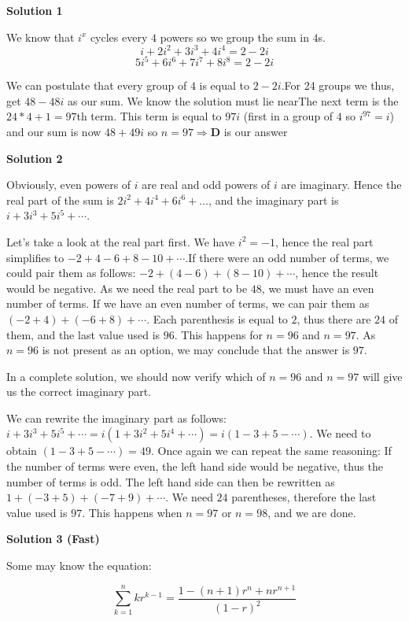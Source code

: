 \begin{enumerate}
\textbf{Solution 1}

We know that $i^x$ cycles every $4$ powers so we group the sum in $4$s. 
 \[i+2i^2+3i^3+4i^4=2-2i\]
 \[5i^5+6i^6+7i^7+8i^8=2-2i\]

 We can postulate that every group of $4$ is equal to $2-2i$.For 24 groups we thus, get $48-48i$ as our sum. We know the solution must lie nearThe next term is the $24*4+1=97$th term. This term is equal to $97i$ (first in a group of $4$ so $i^{97}=i$) and our sum is now $48+49i$ so $n=97\Rightarrow\boxed{\mathbf{D}}$ is our answer

 



\textbf{Solution 2}

Obviously, even powers of $i$ are real and odd powers of $i$ are imaginary. Hence the real part of the sum is $2i^2 + 4i^4 + 6i^6 + \ldots$, and the imaginary part is $i + 3i^3 + 5i^5 + \cdots$.

 Let's take a look at the real part first. We have $i^2=-1$, hence the real part simplifies to $-2+4-6+8-10+\cdots$.If there were an odd number of terms, we could pair them as follows: $-2 + (4-6) + (8-10) + \cdots$, hence the result would be negative. As we need the real part to be $48$, we must have an even number of terms. If we have an even number of terms, we can pair them as $(-2+4) + (-6+8) + \cdots$. Each parenthesis is equal to $2$, thus there are $24$ of them, and the last value used is $96$. This happens for $n=96$ and $n=97$. As $n=96$ is not present as an option, we may conclude that the answer is $\boxed{97}$.

 In a complete solution, we should now verify which of $n=96$ and $n=97$ will give us the correct imaginary part.

 We can rewrite the imaginary part as follows: $i + 3i^3 + 5i^5 + \cdots = i(1 + 3i^2 + 5i^4 + \cdots) = i(1 - 3 + 5 - \cdots)$. We need to obtain $(1 - 3 + 5 - \cdots) = 49$. Once again we can repeat the same reasoning: If the number of terms were even, the left hand side would be negative, thus the number of terms is odd. The left hand side can then be rewritten as $1 + (-3+5) + (-7+9) + \cdots$. We need $24$ parentheses, therefore the last value used is $97$. This happens when $n=97$ or $n=98$, and we are done.

 



\textbf{Solution 3 (Fast)}

Some may know the equation:

 
 \[\sum_{k=1}^{n}kr^{k-1}=\frac{1-(n+1)r^n+nr^{n+1}}{(1-r)^2}\]


\end{enumerate}
